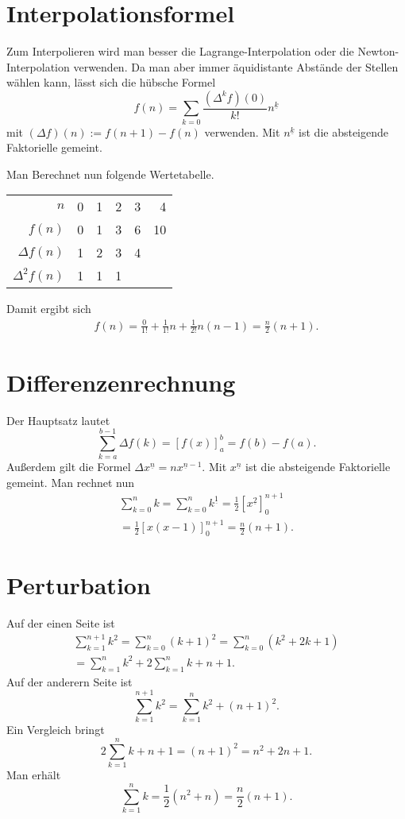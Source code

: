 \documentclass[a4paper,10pt,fleqn,twocolumn,twoside]{article}
\begin{document}
\newpage
\section{Interpolationsformel}

Zum Interpolieren wird man besser die Lagrange-Interpolation oder
die Newton-Interpolation verwenden. Da man aber immer äquidistante
Abstände der Stellen wählen kann, lässt sich die hübsche Formel
\[f(n) = \sum_{k=0} \frac{(\Delta^k f)(0)}{k!}n^{\underline k}\]
mit \((\Delta f)(n):=f(n+1)-f(n)\) verwenden.
Mit \(n^{\underline k}\) ist die absteigende Faktorielle gemeint.

Man Berechnet nun
folgende Wertetabelle.

\begin{tabular}{r|r|r|r|r|r}
\(n\)    & 0 & 1 & 2 & 3 & 4\\
\(f(n)\) & 0 & 1 & 3 & 6 & 10\\
\(\Delta f(n)\) & 1 & 2 & 3 & 4\\
\(\Delta^2 f(n)\) & 1 & 1 & 1
\end{tabular}

Damit ergibt sich
\begin{gather*}
f(n) = \frac{0}{1!} + \frac{1}{1!}n + \frac{1}{2!}n(n-1)
= \frac{n}{2}(n+1).
\end{gather*}

\section{Differenzenrechnung}

Der Hauptsatz lautet
\[\sum_{k=a}^{b-1} \Delta f(k) = [f(x)]_a^b = f(b)-f(a).\]
Außerdem gilt die Formel \(\Delta x^{\underline n} = nx^{\underline n-1}\).
Mit \(x^{\underline n}\) ist die absteigende Faktorielle gemeint. Man rechnet nun
\begin{gather*}\sum_{k=0}^{n} k = \sum_{k=0}^{n} k^{\underline 1}
= \frac{1}{2}[x^{\underline{2}}]_0^{n+1}\\
= \frac{1}{2}[x(x-1)]_0^{n+1}
= \frac{n}{2}(n+1).
\end{gather*}

\section{Perturbation}

Auf der einen Seite ist
\begin{gather*}
\sum_{k=1}^{n+1} k^2 = \sum_{k=0}^n (k+1)^2
= \sum_{k=0}^n (k^2+2k+1)\\
= \sum_{k=1}^n k^2 + 2\sum_{k=1}^n k + n+1.
\end{gather*}
Auf der anderern Seite ist
\[\sum_{k=1}^{n+1} k^2 = \sum_{k=1}^n k^2 + (n+1)^2.\]
Ein Vergleich bringt
\[2\sum_{k=1}^n k +n+1 = (n+1)^2 = n^2+2n+1.\]
Man erhält
\[\sum_{k=1}^n k = \frac{1}{2}(n^2+n) = \frac{n}{2}(n+1).\]
\end{document}
